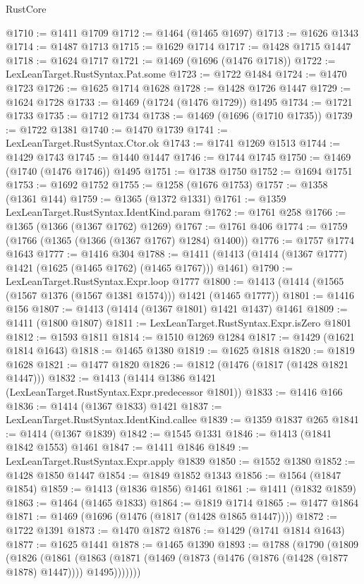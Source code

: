 \begin{lexlean}{RustCore}
\begin{coremodule}
@1710 := @1411 @1709
@1712 := @1464 (@1465 @1697)
@1713 := @1626 @1343
@1714 := @1487 @1713
@1715 := @1629 @1714
@1717 := @1428 @1715 @1447
@1718 := @1624 @1717
@1721 := @1469 (@1696 (@1476 @1718))
@1722 := LexLeanTarget.RustSyntax.Pat.some
@1723 := @1722 @1484
@1724 := @1470 @1723
@1726 := @1625 @1714 @1628
@1728 := @1428 @1726 @1447
@1729 := @1624 @1728
@1733 := @1469 (@1724 (@1476 @1729)) @1495
@1734 := @1721 @1733
@1735 := @1712 @1734
@1738 := @1469 (@1696 (@1710 @1735))
@1739 := @1722 @1381
@1740 := @1470 @1739
@1741 := LexLeanTarget.RustSyntax.Ctor.ok
@1743 := @1741 @1269 @1513
@1744 := @1429 @1743
@1745 := @1440 @1447
@1746 := @1744 @1745
@1750 := @1469 (@1740 (@1476 @1746)) @1495
@1751 := @1738 @1750
@1752 := @1694 @1751
@1753 := @1692 @1752
@1755 := @1258 (@1676 @1753)
@1757 := @1358 (@1361 @144)
@1759 := @1365 (@1372 @1331)
@1761 := @1359 LexLeanTarget.RustSyntax.IdentKind.param
@1762 := @1761 @258
@1766 := @1365 (@1366 (@1367 @1762) @1269)
@1767 := @1761 @406
@1774 := @1759 (@1766 (@1365 (@1366 (@1367 @1767) @1284) @1400))
@1776 := @1757 @1774 @1643
@1777 := @1416 @304
@1788 := @1411 (@1413 (@1414 (@1367 @1777) @1421 (@1625 (@1465 @1762) (@1465 @1767))) @1461)
@1790 := LexLeanTarget.RustSyntax.Expr.loop @1777
@1800 := @1413 (@1414 (@1565 (@1567 @1376 (@1567 @1381 @1574))) @1421 (@1465 @1777))
@1801 := @1416 @156
@1807 := @1413 (@1414 (@1367 @1801) @1421 @1437) @1461
@1809 := @1411 (@1800 @1807)
@1811 := LexLeanTarget.RustSyntax.Expr.isZero @1801
@1812 := @1593 @1811
@1814 := @1510 @1269 @1284
@1817 := @1429 (@1621 @1814 @1643)
@1818 := @1465 @1380
@1819 := @1625 @1818
@1820 := @1819 @1628
@1821 := @1477 @1820
@1826 := @1812 (@1476 (@1817 (@1428 @1821 @1447)))
@1832 := @1413 (@1414 @1386 @1421 (LexLeanTarget.RustSyntax.Expr.predecessor @1801))
@1833 := @1416 @166
@1836 := @1414 (@1367 @1833) @1421
@1837 := LexLeanTarget.RustSyntax.IdentKind.callee
@1839 := @1359 @1837 @265
@1841 := @1414 (@1367 @1839)
@1842 := @1545 @1331
@1846 := @1413 (@1841 @1842 @1553) @1461
@1847 := @1411 @1846
@1849 := LexLeanTarget.RustSyntax.Expr.apply @1839
@1850 := @1552 @1380
@1852 := @1428 @1850 @1447
@1854 := @1849 @1852 @1343
@1856 := @1564 (@1847 @1854)
@1859 := @1413 (@1836 @1856) @1461
@1861 := @1411 (@1832 @1859)
@1863 := @1464 (@1465 @1833)
@1864 := @1819 @1714
@1865 := @1477 @1864
@1871 := @1469 (@1696 (@1476 (@1817 (@1428 @1865 @1447))))
@1872 := @1722 @1391
@1873 := @1470 @1872
@1876 := @1429 (@1741 @1814 @1643)
@1877 := @1625 @1441
@1878 := @1465 @1390
@1893 := @1788
    (@1790
      (@1809
        (@1826
          (@1861
            (@1863 (@1871 (@1469 (@1873 (@1476 (@1876 (@1428 (@1877 @1878) @1447)))) @1495)))))))

\end{coremodule}
\end{lexlean}
